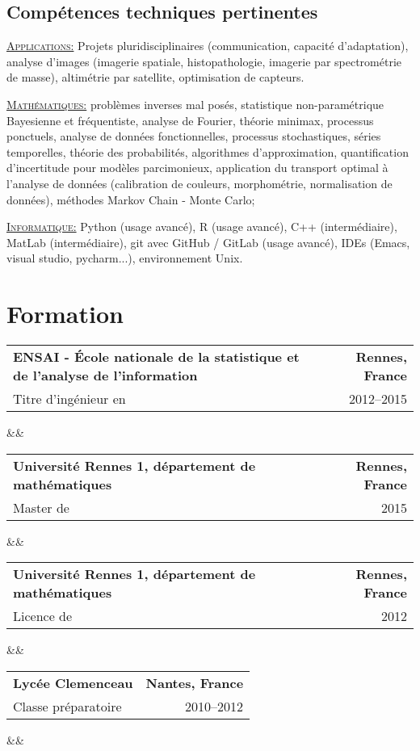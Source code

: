 \documentclass[11pt,a4paper,sans]{moderncv} %
\makeatletter
\renewcommand*{\cventry}[7][.25em]{
\begin{tabular*}{\textwidth}{l@{\extracolsep{\fill}}r}%
{\bfseries #4} & {\bfseries #5} \\%
{#3\ifthenelse{\equal{#6}{}}{}{#6}}&{#2}\\%
\end{tabular*}%
\ifx&#7&%
\else{\\\vbox{\small#7}}\fi%
\par\addvspace{#1}}
\makeatother
\begin{document}
\newpage

\subsection{   Compétences techniques pertinentes}
\begin{multicols}{2}
\underline{\textsc{Applications:}}
Projets pluridisciplinaires (communication, capacité d'adaptation),
analyse d'images (imagerie spatiale, histopathologie, imagerie par spectrométrie de masse),
altimétrie par satellite,
optimisation de capteurs.

\underline{\textsc{Mathématiques:}}
problèmes inverses mal posés,
statistique non-paramétrique Bayesienne et fréquentiste,
analyse de Fourier,
théorie minimax,
processus ponctuels,
analyse de données fonctionnelles,
processus stochastiques,
séries temporelles,
théorie des probabilités,
algorithmes d'approximation,
quantification d'incertitude pour modèles parcimonieux,
application du transport optimal à l'analyse de données (calibration de couleurs, morphométrie, normalisation de données),
méthodes Markov Chain - Monte Carlo;

\underline{\textsc{Informatique:}}
Python (usage avancé),
R (usage avancé),
C++ (intermédiaire),
MatLab (intermédiaire),
git avec GitHub / GitLab (usage avancé),
IDEs (Emacs, visual studio, pycharm...),
environnement Unix.
\end{multicols}


\section{ Formation}
\cventry{2012--2015}{Titre d'ingénieur en }{ENSAI - École nationale de la statistique et de l'analyse de l'information}{Rennes, France}{génie statistique;}{}
\cventry{2015}{Master de }{Université Rennes 1, département de mathématiques}{Rennes, France}{statistique mathématique;}{}  %
\cventry{2012}{Licence de }{Université Rennes 1, département de mathématiques}{Rennes, France}{mathématiques;}{}
\cventry{2010--2012}{Classe préparatoire}{Lycée Clemenceau}{Nantes, France}{Filière MPSI - MP}{}

\medskip
\end{document}
